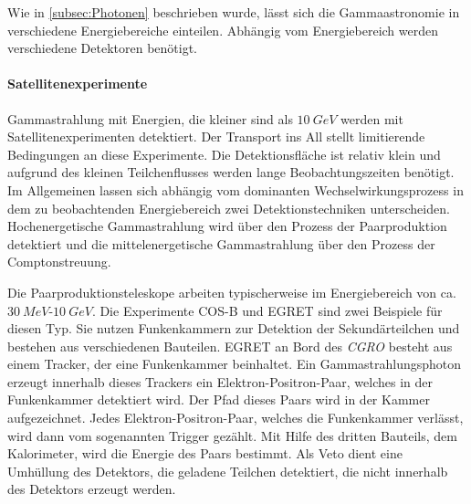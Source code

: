 % 
% 

Wie in \ref{subsec:Photonen} beschrieben wurde, lässt sich die Gammaastronomie in verschiedene Energiebereiche einteilen.
Abhängig vom Energiebereich werden verschiedene Detektoren benötigt.

\paragraph{Satellitenexperimente}
Gammastrahlung mit Energien, die kleiner sind als $\SI{10}{GeV}$ werden mit Satellitenexperimenten detektiert.
Der Transport ins All stellt limitierende Bedingungen an diese Experimente.
Die Detektionsfläche ist relativ klein und aufgrund des kleinen Teilchenflusses werden lange Beobachtungszeiten benötigt.
Im Allgemeinen lassen sich abhängig vom dominanten Wechselwirkungsprozess in dem zu beobachtenden Energiebereich zwei Detektionstechniken unterscheiden.
Hochenergetische Gammastrahlung wird über den Prozess der Paarproduktion detektiert und die mittelenergetische Gammastrahlung über den Prozess der Comptonstreuung.\cite{Weekes}

Die Paarproduktionsteleskope arbeiten typischerweise im Energiebereich von ca. $\SI{30}{MeV}$-$\SI{10}{GeV}$.
Die Experimente COS-B \cite{CosB} und EGRET \cite{EGRET} sind zwei Beispiele für diesen Typ.
Sie nutzen Funkenkammern zur Detektion der Sekundärteilchen und bestehen aus verschiedenen Bauteilen.
EGRET \cite{EGRET} an Bord des \textit{CGRO} besteht aus einem Tracker, der eine Funkenkammer beinhaltet.
Ein Gammastrahlungsphoton erzeugt innerhalb dieses Trackers ein Elektron-Positron-Paar, welches in der Funkenkammer detektiert wird.
Der Pfad dieses Paars wird in der Kammer aufgezeichnet.
Jedes Elektron-Positron-Paar, welches die Funkenkammer verlässt, wird dann vom sogenannten Trigger gezählt.
Mit Hilfe des dritten Bauteils, dem Kalorimeter, wird die Energie des Paars bestimmt.
Als Veto dient eine Umhüllung des Detektors, die geladene Teilchen detektiert, die nicht innerhalb des Detektors erzeugt werden.\cite{Weekes}

